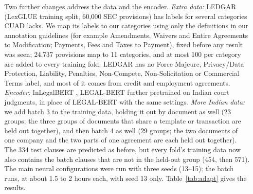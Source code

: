 \documentclass[conference]{IEEEtran}
\begin{document}
Two further changes address the data and the encoder. \emph{Extra data:} LEDGAR \cite{tuggener2020ledgar} (LexGLUE training split, 60,000 SEC provisions) has labels for several categories CUAD lacks. We map its labels to our categories using only the definitions in our annotation guidelines (for example Amendments, Waivers and Entire Agreements to Modification; Payments, Fees and Taxes to Payment), fixed before any result was seen; 24,737 provisions map to 11 categories, and at most 100 per category are added to every training fold. LEDGAR has no Force Majeure, Privacy/Data Protection, Liability, Penalties, Non-Compete, Non-Solicitation or Commercial Terms label, and most of it comes from credit and employment agreements. \emph{Encoder:} InLegalBERT \cite{paul2023inlegalbert}, LEGAL-BERT further pretrained on Indian court judgments, in place of LEGAL-BERT with the same settings. \emph{More Indian data:} we add batch 3 to the training data, holding it out by document as well (23 groups; the three groups of documents that share a template or transaction are held out together), and then batch 4 as well (29 groups; the two documents of one company and the two parts of one agreement are each held out together). The 334 test clauses are predicted as before, but every fold's training data now also contains the batch clauses that are not in the held-out group (454, then 571). The main neural configurations were run with three seeds (13--15); the batch runs, at about 1.5 to 2 hours each, with seed 13 only. Table~\ref{tab:adapt} gives the results.
\end{document}
